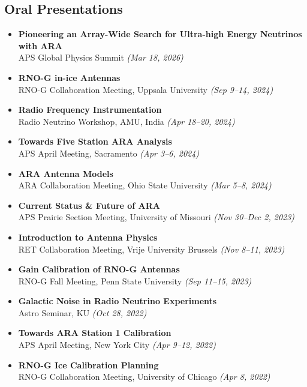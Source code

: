 \documentclass[10pt]{report}
\begin{document}
\subsection*{Oral Presentations}
\begin{itemize}

    \item \textbf{Pioneering an Array-Wide Search for Ultra-high Energy Neutrinos with ARA} \\
    APS Global Physics Summit \textit{(Mar 18, 2026)}

    \item \textbf{RNO-G in-ice Antennas} \\
    RNO-G Collaboration Meeting, Uppsala University \textit{(Sep 9--14, 2024)}
    
    \item \textbf{Radio Frequency Instrumentation} \\
    Radio Neutrino Workshop, AMU, India \textit{(Apr 18--20, 2024)}
    
    \item \textbf{Towards Five Station ARA Analysis} \\
    APS April Meeting, Sacramento \textit{(Apr 3--6, 2024)}
    
    \item \textbf{ARA Antenna Models} \\
    ARA Collaboration Meeting, Ohio State University \textit{(Mar 5--8, 2024)}
    
    \item \textbf{Current Status \& Future of ARA} \\
    APS Prairie Section Meeting, University of Missouri \textit{(Nov 30--Dec 2, 2023)}
    
    \item \textbf{Introduction to Antenna Physics} \\
    RET Collaboration Meeting, Vrije University Brussels \textit{(Nov 8--11, 2023)}
    
    \item \textbf{Gain Calibration of RNO-G Antennas} \\
    RNO-G Fall Meeting, Penn State University \textit{(Sep 11--15, 2023)}

    \item \textbf{Galactic Noise in Radio Neutrino Experiments} \\
    Astro Seminar, KU \textit{(Oct 28, 2022)}
    
    \item \textbf{Towards ARA Station 1 Calibration} \\
    APS April Meeting, New York City \textit{(Apr 9--12, 2022)}
    
    \item \textbf{RNO-G Ice Calibration Planning} \\
    RNO-G Collaboration Meeting, University of Chicago \textit{(Apr 8, 2022)}
\end{itemize}
\end{document}
